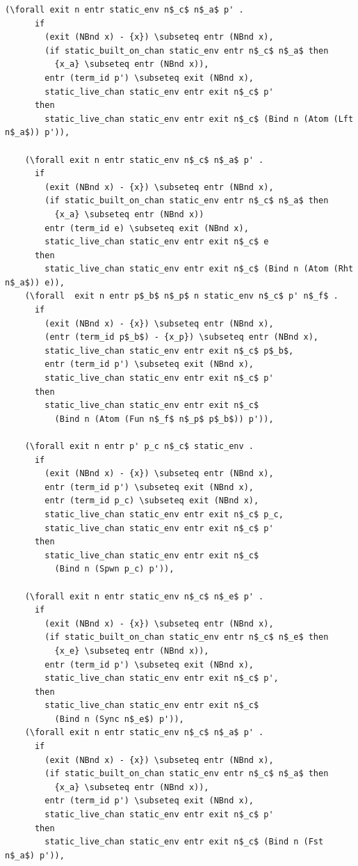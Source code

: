 \documentclass[10pt]{article}
\begin{document}
\begin{lstlisting}[language=logic, mathescape]
    (\forall exit n entr static_env n$_c$ n$_a$ p' . 
      if
        (exit (NBnd x) - {x}) \subseteq entr (NBnd x),
        (if static_built_on_chan static_env entr n$_c$ n$_a$ then
          {x_a} \subseteq entr (NBnd x)),
        entr (term_id p') \subseteq exit (NBnd x),
        static_live_chan static_env entr exit n$_c$ p'
      then
        static_live_chan static_env entr exit n$_c$ (Bind n (Atom (Lft n$_a$)) p')),

    (\forall exit n entr static_env n$_c$ n$_a$ p' . 
      if
        (exit (NBnd x) - {x}) \subseteq entr (NBnd x),
        (if static_built_on_chan static_env entr n$_c$ n$_a$ then
          {x_a} \subseteq entr (NBnd x))
        entr (term_id e) \subseteq exit (NBnd x),
        static_live_chan static_env entr exit n$_c$ e
      then
        static_live_chan static_env entr exit n$_c$ (Bind n (Atom (Rht n$_a$)) e)),
    (\forall  exit n entr p$_b$ n$_p$ n static_env n$_c$ p' n$_f$ . 
      if
        (exit (NBnd x) - {x}) \subseteq entr (NBnd x),
        (entr (term_id p$_b$) - {x_p}) \subseteq entr (NBnd x),
        static_live_chan static_env entr exit n$_c$ p$_b$,
        entr (term_id p') \subseteq exit (NBnd x),
        static_live_chan static_env entr exit n$_c$ p'
      then
        static_live_chan static_env entr exit n$_c$
          (Bind n (Atom (Fun n$_f$ n$_p$ p$_b$)) p')),

    (\forall exit n entr p' p_c n$_c$ static_env .
      if
        (exit (NBnd x) - {x}) \subseteq entr (NBnd x),
        entr (term_id p') \subseteq exit (NBnd x),
        entr (term_id p_c) \subseteq exit (NBnd x),
        static_live_chan static_env entr exit n$_c$ p_c,
        static_live_chan static_env entr exit n$_c$ p'
      then
        static_live_chan static_env entr exit n$_c$
          (Bind n (Spwn p_c) p')),

    (\forall exit n entr static_env n$_c$ n$_e$ p' .
      if
        (exit (NBnd x) - {x}) \subseteq entr (NBnd x),
        (if static_built_on_chan static_env entr n$_c$ n$_e$ then
          {x_e} \subseteq entr (NBnd x)),
        entr (term_id p') \subseteq exit (NBnd x),
        static_live_chan static_env entr exit n$_c$ p',
      then
        static_live_chan static_env entr exit n$_c$
          (Bind n (Sync n$_e$) p')),
    (\forall exit n entr static_env n$_c$ n$_a$ p' .
      if
        (exit (NBnd x) - {x}) \subseteq entr (NBnd x),
        (if static_built_on_chan static_env entr n$_c$ n$_a$ then
          {x_a} \subseteq entr (NBnd x)),
        entr (term_id p') \subseteq exit (NBnd x),
        static_live_chan static_env entr exit n$_c$ p'
      then
        static_live_chan static_env entr exit n$_c$ (Bind n (Fst n$_a$) p')),


\end{lstlisting}
\end{document}
